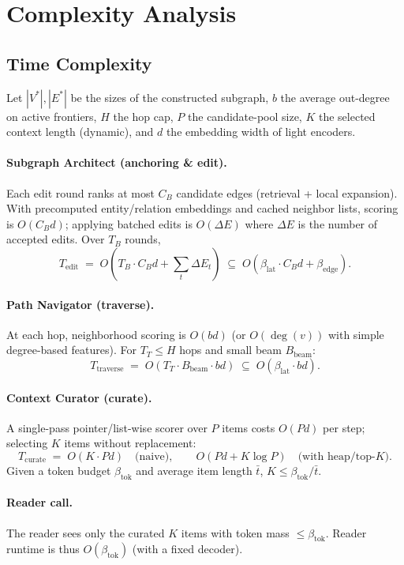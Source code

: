 \documentclass{article} %
\begin{document}
\section{Complexity Analysis}
\label{app:complexity}

\subsection{Time Complexity}
Let $|V^\ast|,|E^\ast|$ be the sizes of the constructed subgraph, $b$ the average out-degree on active frontiers, $H$ the hop cap, $P$ the candidate-pool size, $K$ the selected context length (dynamic), and $d$ the embedding width of light encoders.

\paragraph{Subgraph Architect (anchoring \& edit).}
Each edit round ranks at most $C_B$ candidate edges (retrieval + local expansion). With precomputed entity/relation embeddings and cached neighbor lists, scoring is $O(C_B d)$; applying batched edits is $O(\Delta E)$ where $\Delta E$ is the number of accepted edits. Over $T_B$ rounds,
\[
T_{\text{edit}} \;=\; O(T_B\cdot C_B d + \sum_{t}{\Delta E_t}) \;\subseteq\; O(\beta_{\text{lat}}\cdot C_B d + \beta_{\text{edge}}).
\]

\paragraph{Path Navigator (traverse).}
At each hop, neighborhood scoring is $O(b d)$ (or $O(\deg(v))$ with simple degree-based features). For $T_T \le H$ hops and small beam $B_{\text{beam}}$:
\[
T_{\text{traverse}} \;=\; O(T_T \cdot B_{\text{beam}} \cdot b d) \;\subseteq\; O(\beta_{\text{lat}}\cdot b d).
\]

\paragraph{Context Curator (curate).}
A single-pass pointer/list-wise scorer over $P$ items costs $O(P d)$ per step; selecting $K$ items without replacement:
\[
T_{\text{curate}} \;=\; O(K \cdot P d) \quad \text{(naive)}, 
\qquad 
O(P d + K\log P) \quad \text{(with heap/top-$K$)}.
\]
Given a token budget $\beta_{\text{tok}}$ and average item length $\bar t$, $K \le \beta_{\text{tok}}/\bar t$.

\paragraph{Reader call.}
The reader sees only the curated $K$ items with token mass $\le \beta_{\text{tok}}$. Reader runtime is thus $O(\beta_{\text{tok}})$ (with a fixed decoder).
\end{document}
